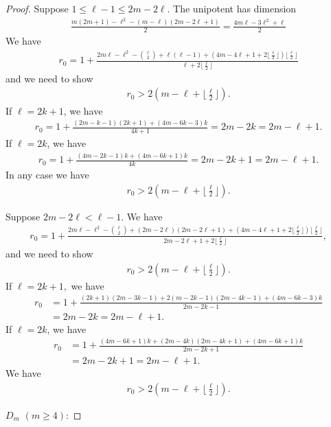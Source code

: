 \documentclass[11pt,a4paper,usenames,dvipsnames,reqno]{amsart}
\numberwithin{equation}{section}
\theoremstyle{definition}
\theoremstyle{remark}
\begin{document}
{\begin{proof}
Suppose $1\le \ell-1\le 2m-2\ell$. The unipotent has dimension
\begin{align*}
    \frac{m(2m+1)-\ell^2-(m-\ell)(2m-2\ell+1)}{2}=\frac{4m\ell-3\ell^2+\ell}{2}
\end{align*}
We have
\begin{align*}
    r_0=1+\frac{2m\ell-\ell^2-\binom{\ell}{2}+\ell(\ell-1)+(4m-4\ell+1+2\lfloor\frac{\ell}{2}\rfloor)\lfloor \frac{\ell}{2}\rfloor }{\ell+2\lfloor \frac{\ell}{2}\rfloor}
\end{align*}
and we need to show
\begin{align*}
    r_0>2(m-\ell+\lfloor \frac{\ell}{2}\rfloor ).
\end{align*}
If $\ell=2k+1$, we have
\begin{align*}
    r_0=1+\frac{(2m-k-1)(2k+1)+(4m-6k-3)k}{4k+1}=2m-2k=2m-\ell+1.
\end{align*}
If $\ell=2k$, we have
\begin{align*}
    r_0=1+\frac{(4m-2k-1)k+(4m-6k+1)k}{4k}=2m-2k+1=2m-\ell+1.
\end{align*}
In any case we have
\begin{align*}
    r_0>2(m-\ell+\lfloor \frac{\ell}{2}\rfloor ).
\end{align*}


Suppose $2m-2\ell<\ell-1$. We have
\begin{align*}
    r_0=1+\frac{2m\ell-\ell^2-\binom{\ell}{2}+(2m-2\ell)(2m-2\ell+1)+(4m-4\ell+1+2\lfloor\frac{\ell}{2}\rfloor)\lfloor \frac{\ell}{2}\rfloor }{2m-2\ell+1+2\lfloor \frac{\ell}{2}\rfloor},
\end{align*}
and we need to show
\begin{align*}
    r_0>2(m-\ell+\lfloor\frac{\ell}{2}\rfloor).
\end{align*}
If $\ell=2k+1,$ we have
\begin{align*}
    r_0&=1+\frac{(2k+1)(2m-3k-1)+2(m-2k-1)(2m-4k-1)+(4m-6k-3)k}{2m-2k-1}\\
    &=2m-2k=2m-\ell+1.
\end{align*}
If $\ell=2k$, we have
\begin{align*}
     r_0&=1+\frac{(4m-6k+1)k+(2m-4k)(2m-4k+1)+(4m-6k+1)k}{2m-2k+1}\\
     &=2m-2k+1=2m-\ell+1.
\end{align*}
We have
\begin{align*}
r_0>2(m-\ell+\lfloor\frac{\ell}{2}\rfloor).
\end{align*}

$D_m$ $(m\ge 4)$:


\end{proof}}
\end{document}
